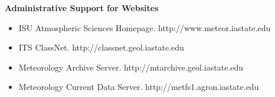 \Large \bf Administrative Support for Websites\\
\normalsize \sf
\begin{itemize}
\item ISU Atmospheric Sciences Homepage. http://www.meteor.iastate.edu
\item ITS ClassNet. http://classnet.geol.iastate.edu
\item Meteorology Archive Server. http://mtarchive.geol.iastate.edu
\item Meteorology Current Data Server. http://metfs1.agron.iastate.edu
\end{itemize}

\pagebreak

